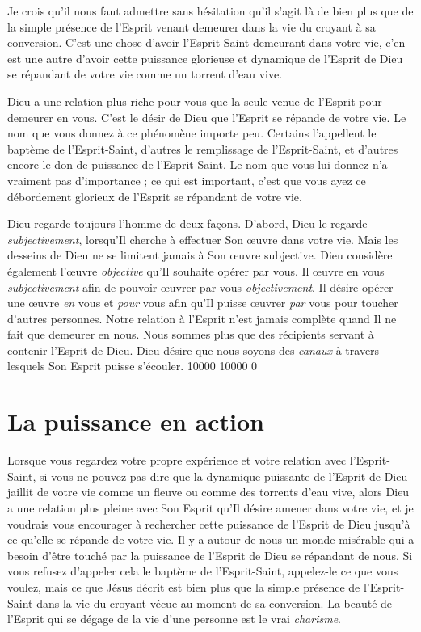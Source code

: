 Je crois qu'il nous faut admettre sans hésitation qu'il s'agit là de bien
 plus que de la simple présence de l'Esprit venant demeurer dans la vie
 du croyant à sa conversion. C'est une chose d'avoir l'Esprit-Saint
 demeurant dans votre vie, c'en est une autre d'avoir cette puissance
 glorieuse et dynamique de l'Esprit de Dieu se répandant de votre vie
 comme un torrent d'eau vive.

Dieu a une relation plus riche pour vous que la seule venue de l'Esprit
 pour demeurer en vous. C'est le désir de Dieu que l'Esprit se répande
 de votre vie. Le nom que vous donnez à ce phénomène importe peu.
 Certains l'appellent le baptème de l'Esprit-Saint,
 d'autres le remplissage de l'Esprit-Saint, et d'autres encore le don
 de puissance de l'Esprit-Saint. Le nom que vous lui donnez n'a vraiment
 pas d'im\-por\-tan\-ce ; ce qui est important, c'est que vous ayez ce débordement
 glorieux de l'Esprit se répandant de votre vie.

Dieu regarde toujours l'homme de deux façons. D'abord, Dieu le regarde
 \emph{subjectivement}, lorsqu'Il cherche à effectuer Son œuvre
 dans votre vie.
 Mais les desseins de Dieu ne se limitent jamais à Son œuvre subjective.
 Dieu considère également l'œuvre \emph{objective} qu'Il souhaite opérer
 par vous.
 Il œuvre en vous \emph{subjectivement} afin de pouvoir œuvrer par vous
 \emph{objectivement}. Il désire opérer une œuvre \emph{en} vous
 et \emph{pour} vous afin
 qu'Il puisse œuvrer \emph{par} vous pour toucher d'autres personnes.
 Notre relation à l'Esprit n'est jamais complète quand Il ne fait que
 demeurer en nous. Nous sommes plus que des récipients servant à contenir
 l'Esprit de Dieu. Dieu désire que nous soyons des \emph{canaux} à travers
 lesquels Son Esprit puisse s'écouler.
 \begingroup{} 10000 10000 0
 \par\endgroup


\section{La puissance en action}


Lorsque vous regardez votre propre expérience et votre relation
 avec l'Esprit-Saint, si vous ne pouvez pas dire que la dynamique puissante
 de l'Esprit de Dieu jaillit de votre vie comme un fleuve ou comme
 des torrents d'eau vive, alors Dieu a une relation plus pleine
 avec Son Esprit qu'Il désire amener dans votre vie,
 et je voudrais vous encourager à rechercher cette puissance de l'Esprit
 de Dieu jusqu'à ce qu'elle se répande de votre vie.
 Il y a autour de nous un monde misérable qui a besoin d'être touché
 par la puissance de l'Esprit de Dieu se répandant de nous.
 Si vous refusez d'appeler cela le baptème de l'Esprit-Saint,
 appelez-le ce que vous voulez, mais ce que Jésus décrit est bien plus
 que la simple présence de l'Esprit-Saint dans la vie du croyant
 vécue au moment de sa conversion. La beauté de l'Esprit qui se dégage de la vie
 d'une personne est le vrai \emph{charisme}.
\closechapter


